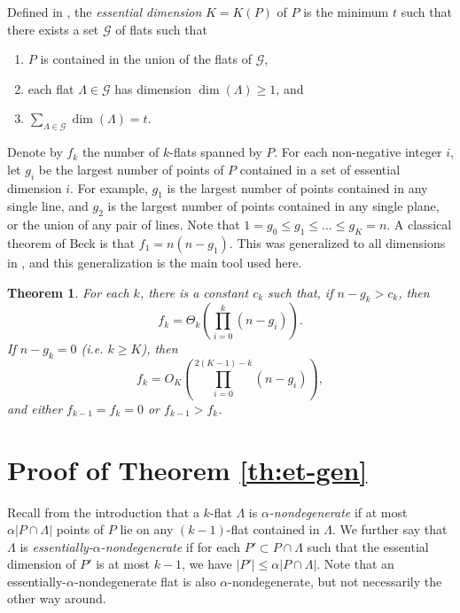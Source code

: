 \documentclass{article}
\newtheorem{theorem}{Theorem}
\begin{document}
Defined in \cite{lund2016essential}, the {\em essential dimension} $K=K(P)$ of $P$ is the minimum $t$ such that there exists a set $\mathcal{G}$ of flats such that
\begin{enumerate}
\item $P$ is contained in the union of the flats of $\mathcal{G}$,
\item each flat $\Lambda \in \mathcal{G}$ has dimension $\dim(\Lambda) \geq 1$, and
\item $\sum_{\Lambda \in \mathcal{G}} \dim(\Lambda) = t$.
\end{enumerate}

Denote by $f_k$ the number of $k$-flats spanned by $P$.
For each non-negative integer $i$, let $g_i$ be the largest number of points of $P$ contained in a set of essential dimension $i$.
For example, $g_1$ is the largest number of points contained in any single line, and $g_2$ is the largest number of points contained in any single plane, or the union of any pair of lines.
Note that $1=g_0 \leq g_1 \leq \ldots \leq g_K = n$.
A classical theorem of Beck \cite{beck1983lattice} is that $f_1 = n(n-g_1)$.
This was generalized to all dimensions in \cite{lund2016essential}, and this generalization is the main tool used here.
\begin{theorem}\label{thm:essentialDimBound}
For each $k$, there is a constant $c_k$ such that, if $n-g_k > c_k$, then
$$f_k = \Theta_k \left(\prod_{i=0}^k (n-g_i) \right).$$
If $n-g_k = 0$ ({i.e.} $k \geq K$), then
$$f_k = O_K\left(\prod_{i=0}^{2(K-1) - k} (n-g_i)\right),$$
and either $f_{k-1} = f_k = 0$ or $f_{k-1} > f_k$.
\end{theorem}
















\section{Proof of Theorem \ref{th:et-gen}}

Recall from the introduction that a $k$-flat $\Lambda$ is {\em $\alpha$-nondegenerate} if at most $\alpha |P \cap \Lambda|$ points of $P$ lie on any $(k-1)$-flat contained in $\Lambda$.
We further say that $\Lambda$ is {\em essentially-$\alpha$-nondegenerate} if for each $P' \subset P \cap \Lambda$ such that the essential dimension of $P'$ is at most $k-1$, we have $|P'| \leq \alpha |P \cap \Lambda|$.
Note that an essentially-$\alpha$-nondegenerate flat is also $\alpha$-nondegenerate, but not necessarily the other way around.
\end{document}
